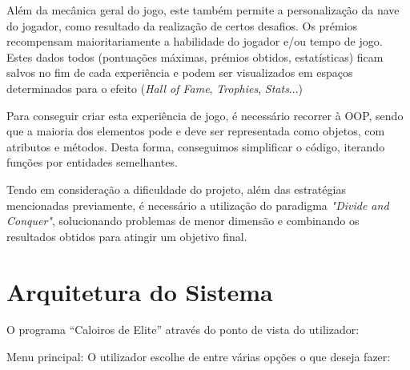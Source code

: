 \documentclass[a4paper,11pt]{article}
\begin{document}
\vspace{8pt}

Além da mecânica geral do jogo, este também permite a personalização da nave do jogador, como resultado da realização de certos desafios. Os prémios recompensam maioritariamente a habilidade do jogador e/ou tempo de jogo. Estes dados todos (pontuações máximas, prémios obtidos, estatísticas) ficam salvos no fim de cada experiência e podem ser visualizados em espaços determinados para o efeito (\textit{Hall of Fame}, \textit{Trophies}, \textit{Stats}...)

\vspace{8pt}

Para conseguir criar esta experiência de jogo, é necessário recorrer à OOP, sendo que a maioria dos elementos pode e deve ser representada como objetos, com atributos e métodos. Desta forma, conseguimos simplificar o código, iterando funções por entidades semelhantes.

\vspace{8pt}

Tendo em consideração a dificuldade do projeto, além das estratégias mencionadas previamente, é necessário a utilização do paradigma \textit{"Divide and Conquer"}, solucionando problemas de menor dimensão e combinando os resultados obtidos para atingir um objetivo final.

\pagebreak

\section{Arquitetura do Sistema}

\vspace{8pt}

O programa “Caloiros de Elite” através do ponto de vista do utilizador:

\vspace{8pt}

Menu principal: O utilizador escolhe de entre várias opções o que deseja fazer:
\end{document}
